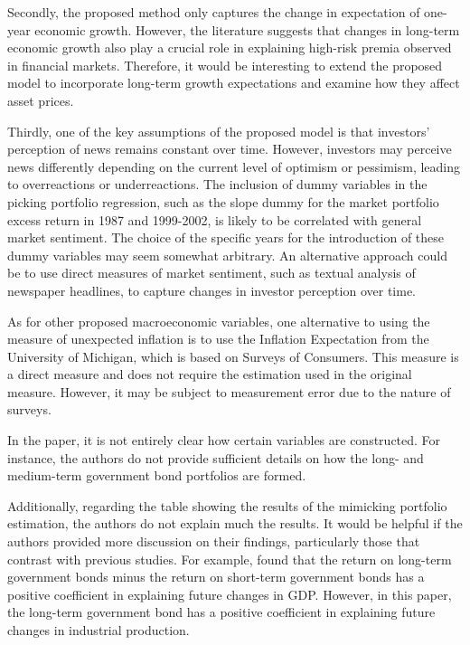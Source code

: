 \documentclass[12pt,a4paper]{ouparticle}
\begin{document}
Secondly, the proposed method only captures the change in expectation of one-year economic growth. However, the literature \citep{bansal2004risks} suggests that changes in long-term economic growth also play a crucial role in explaining high-risk premia observed in financial markets. Therefore, it would be interesting to extend the proposed model to incorporate long-term growth expectations and examine how they affect asset prices.

Thirdly, one of the key assumptions of the proposed model is that investors' perception of news remains constant over time. However, investors may perceive news differently depending on the current level of optimism or pessimism, leading to overreactions or underreactions. The inclusion of dummy variables in the picking portfolio regression, such as the slope dummy for the market portfolio excess return in 1987 and 1999-2002, is likely to be correlated with general market sentiment. The choice of the specific years for the introduction of these dummy variables may seem somewhat arbitrary. An alternative approach could be to use direct measures of market sentiment, such as textual analysis of newspaper headlines, to capture changes in investor perception over time.

As for other proposed macroeconomic variables, one alternative to using the measure of unexpected inflation is to use the Inflation Expectation from the University of Michigan, which is based on Surveys of Consumers. This measure is a direct measure and does not require the estimation used in the original measure. However, it may be subject to measurement error due to the nature of surveys.

In the paper, it is not entirely clear how certain variables are constructed. For instance, the authors do not provide sufficient details on how the long- and medium-term government bond portfolios are formed.

Additionally, regarding the table showing the results of the mimicking portfolio estimation, the authors do not explain much the results. It would be helpful if the authors provided more discussion on their findings, particularly those that contrast with previous studies. For example, \cite{vassalou2003news} found that the return on long-term government bonds minus the return on short-term government bonds has a positive coefficient in explaining future changes in GDP. However, in this paper, the long-term government bond has a positive coefficient in explaining future changes in industrial production.
\end{document}
